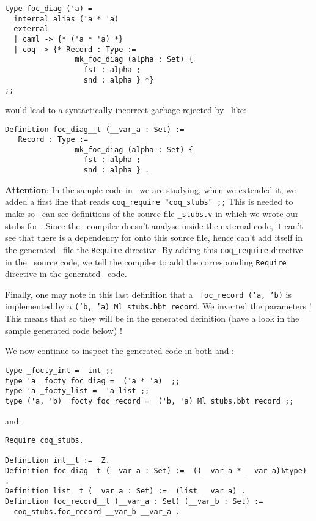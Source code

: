 {\footnotesize
\begin{lstlisting}
type foc_diag ('a) =
  internal alias ('a * 'a)
  external
  | caml -> {* ('a * 'a) *}
  | coq -> {* Record : Type :=
                mk_foc_diag (alpha : Set) {
                  fst : alpha ;
                  snd : alpha } *}
;;
\end{lstlisting}
}
would lead to a syntactically incorrect garbage rejected by \coq\
like:

{\footnotesize
\begin{lstlisting}[language=MyCoq]
Definition foc_diag__t (__var_a : Set) :=
   Record : Type :=
                mk_foc_diag (alpha : Set) {
                  fst : alpha ;
                  snd : alpha } .
\end{lstlisting}
}

\medskip
{\bf Attention}: In the sample code in \focalize\ we are studying,
when we extended it, we added a first line that reads
\lstinline!coq_require "coq_stubs" ;;! This is needed to make so \coq\
can see definitions of the source file  {\tt \coq\_stubs.v} in which we
wrote our stubs for \coq. Since the \focalize\ compiler doesn't
analyse inside the external code, it can't see that there is a
dependency for \coq onto this source file, hence can't add itself in
the generated \coq\ file the {\tt Require} directive. By adding this
{\tt coq\_require} directive in the \focalize\ source code, we tell
the compiler to add the corresponding {\tt Require} directive in the
generated \coq\ code.

\medskip
Finally, one may note in this last definition that a
\focalize\ {\tt foc\_record ('a, 'b)} is implemented by a
{\tt ('b, 'a) Ml\_stubs.bbt\_record}. We inverted the parameters !
This means that so they will be in the generated definition (have a
look in the sample generated code below) !

\medskip
We now continue to inspect the generated code in both \ocaml and \coq:

{\footnotesize
\begin{lstlisting}[language=MyOCaml,
                   title=\ocaml\ code for external definitions (2)]
type _focty_int =  int ;;
type 'a _focty_foc_diag =  ('a * 'a)  ;;
type 'a _focty_list =  'a list ;;
type ('a, 'b) _focty_foc_record =  ('b, 'a) Ml_stubs.bbt_record ;;
\end{lstlisting}
}
\noindent and:

{\footnotesize
\begin{lstlisting}[language=MyCoq,
                   title=\coq\ code for external definitions (2)]
Require coq_stubs.

Definition int__t :=  Z.
Definition foc_diag__t (__var_a : Set) :=  ((__var_a * __var_a)%type) .
Definition list__t (__var_a : Set) :=  (list __var_a) .
Definition foc_record__t (__var_a : Set) (__var_b : Set) :=
  coq_stubs.foc_record __var_b __var_a .
\end{lstlisting}
}

